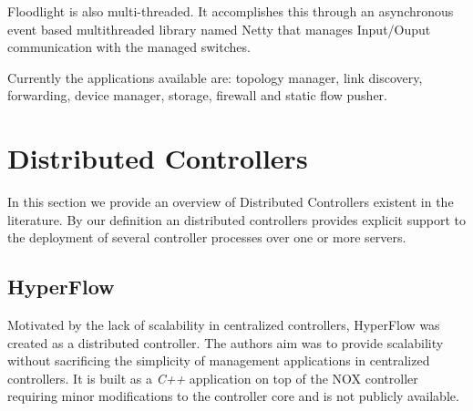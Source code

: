 \documentclass[12pt,openright,twoside]{report}
\begin{document}
\begin{itemize}
Floodlight is also multi-threaded. It accomplishes this through an
asynchronous event based multithreaded library named Netty \cite{netty} that manages Input/Ouput communication with the managed
switches. 

Currently the applications available are: topology manager,  link
discovery, forwarding, device manager, storage, firewall and
static flow pusher.  


\section{Distributed Controllers}
\glsresetall
\label{sec:relatedWork:distributed}

In this section we provide an overview of Distributed Controllers
existent in the literature. By our definition an distributed
controllers provides explicit support to the deployment of several
controller processes over one or more servers. 

\subsection{HyperFlow}
Motivated by the lack of scalability in centralized controllers, HyperFlow \cite{Tootoonchian:2010vy} 
was created as a distributed controller. The 
authors aim was to provide scalability without sacrificing
the simplicity of management applications  in  centralized controllers. It
is built as a \emph{C++} application on top of the NOX 
controller \cite{Gude:2008jd} requiring minor modifications to the
controller core and is not publicly available. 


\end{itemize}
\end{document}
